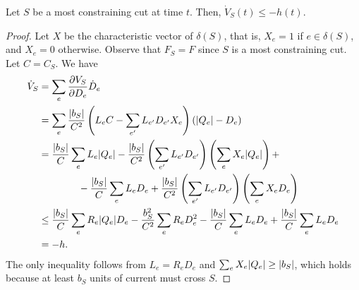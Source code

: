 \documentclass[11pt,a4paper]{article}
\begin{document}

\begin{lemma}
\label{lem:equality transportation}
Let $S$ be a most constraining cut at time $t$. Then, $\dot{V}_S(t) \le
-h(t)$. 
\end{lemma}
\begin{proof}
Let $X$ be the characteristic vector of $\delta(S)$, that is, $X_e = 1$ if $e
\in \delta(S)$, and $X_e = 0$ otherwise. Observe that $F_S = F$ since $S$ is a most
constraining cut. Let $C = C_S$. 
We have
\begin{align*}
\dot{V}_S &= \sum_e \frac{\partial V_S}{\partial D_e} \dot{D}_e \\
&= \sum_e \frac{| b_S |}{C^2} \left( L_e C - \sum_{e'} L_{e'} D_{e'} X_e \right)
\left( | Q_e | - D_e \right) \\
&= \frac{| b_S |}{C} \sum_e L_e | Q_e | - \frac{| b_S |}{C^2} \left(\sum_{e'} L_{e'} D_{e'}
\right) \left(\sum_e X_e | Q_e | \right) + \\
& \qquad\qquad
- \frac{| b_S |}{C} \sum_e L_e D_e  + \frac{| b_S |}{C^2} \left(\sum_{e'} L_{e'} D_{e'} \right)
\left(\sum_e X_e D_e \right) \\
&\le \frac{| b_S |}{C} \sum_e R_e | Q_e | D_e  - \frac{b_S^2}{C^2} \sum_{e} R_{e} D_{e}^2
- \frac{| b_S |}{C} \sum_e L_e D_e  + \frac{| b_S |}{C} \sum_{e} L_{e} D_{e}  \\
&= -h. 
\end{align*}
The only inequality follows from $L_e=R_e D_e$ and $\sum_e X_e | Q_e | \ge
| b_S |$, which holds
because at least $b_S$ units of current must cross $S$.  
\end{proof}
\end{document}
